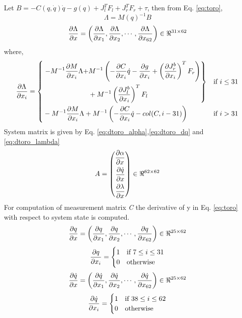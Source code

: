 Let $B = -C(q,\dot{q})\dot{q} - g(q) + J_{l}^{T}F_{l} + J_{r}^{T}F_{r} + \tau$, then from Eq. \ref{eq:toro},
$$\Lambda = M(q)^{-1}B$$
 \begin{equation}
 \label{eq:dtoro_lambda}
\frac{\partial {\Lambda}}{\partial {x}} = \left(\frac{\partial {\Lambda}}{\partial {x_{1}}}, \frac{\partial {\Lambda}}{\partial {x_{2}}}, \cdots , \frac{\partial {\Lambda}}{\partial {x_{62}}}\right) \in \Re^{31 \times 62}
\end{equation}
where,
\[
\frac{\partial {\Lambda}}{\partial {x_{i}}} = 
\left\{ 
\!\begin{aligned}
	& \left. \!\begin{aligned}
	-M^{-1}\frac{\partial {M}}{\partial {x_{i}}}\Lambda + &M^{-1}\left(-\frac{\partial {C}}{\partial {x_{i}}}\dot{q} -\frac{\partial {g}}{\partial {x_{i}}}        + \left(\frac{\partial {J_{r}^{b}}}{\partial {x_{i}}}\right)^{T}F_{r}\right) \\
	& + M^{-1}\left(\frac{\partial {J_{l}^{b}}}{\partial {x_{i}}}\right)^{T}F_{l}
	\end{aligned} \right\}& \text{if } i \leq 31 \\
&-M^{-1}\frac{\partial {M}}{\partial {x_{i}}}\Lambda + M^{-1}\left(-\frac{\partial {C}}{\partial {x_{i}}}\dot{q}- col(C,i-31)\right) & \text{if } i > 31  \\
\end{aligned}
\right.
\]
System matrix is given by Eq. \ref{eq:dtoro_alpha},\ref{eq:dtoro_dq} and \ref{eq:dtoro_lambda}
\begin{equation}
\label{eq:sys_A}
A = \left(
\begin{aligned}
\frac{\partial {\alpha}}{\partial {x}} \\
\frac{\partial {\dot{q}}}{\partial {x}} \\
\frac{\partial {\lambda}}{\partial {x}}
\end{aligned} \right)
\in \Re^{62 \times 62}
\end{equation}
For computation of measurement matrix \emph{C} the derivative of y in Eq. \ref{eq:toro} with respect to system state is computed.
\begin{equation}
\label{eq:dmsr_q}
\frac{\partial {q}}{\partial {x}} = \left(\frac{\partial {q}}{\partial {x_{1}}}, \frac{\partial {q}}{\partial {x_{2}}}, \cdots , \frac{\partial {q}}{\partial {x_{62}}}\right) \in \Re^{25 \times 62}
\end{equation}
 \[
 \frac{\partial {q}}{\partial {x_{i}}} =
 \begin{cases}
 1 & \text{if } 7 \leq i \leq 31 \\
 0 & \text{otherwise}
 \end{cases}
 \]
 \begin{equation}
 \label{eq:dmsr_dq}
\frac{\partial {\dot{q}}}{\partial {x}} = \left(\frac{\partial {\dot{q}}}{\partial {x_{1}}}, \frac{\partial {\dot{q}}}{\partial {x_{2}}}, \cdots , \frac{\partial {\dot{q}}}{\partial {x_{62}}}\right) \in \Re^{25 \times 62}
\end{equation}
  \[
 \frac{\partial {\dot{q}}}{\partial {x_{i}}} =
 \begin{cases}
 1 & \text{if } 38 \leq i \leq 62 \\
 0 & \text{otherwise}
 \end{cases}
 \]
